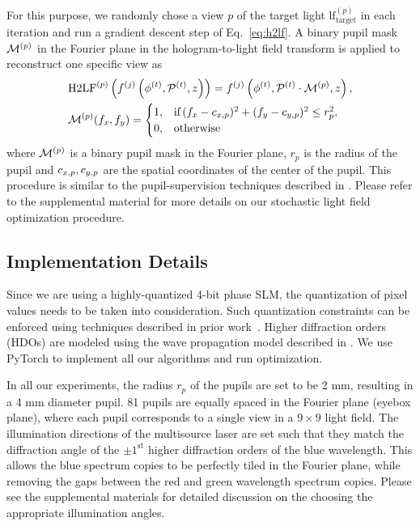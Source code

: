For this purpose, we randomly chose a view $p$ of the target light $\text{lf}^{(p)}_\text{target}$ in each iteration and run a gradient descent step of Eq.~\ref{eq:h2lf}. A binary pupil mask $\mathcal{M}^{(p)}$ in the Fourier plane in the hologram-to-light field transform is applied to reconstruct one specific view as 
%
\begin{equation}
\begin{split}
    & \text{H2LF}^{(p)}\left( f^{(j)} \left(\phi^{(t)}, \mathcal{P}^{(t)}, z\right) \right) = f^{(j)} \left(\phi^{(t)}, \mathcal{P}^{(t)} \cdot \mathcal{M}^{(p)}, z\right), \\
    & \mathcal{M}^{(p)}(f_x, f_y) = \begin{cases}
        1, & \text{if} \, (f_x - c_{x, p})^2 + (f_y - c_{y, p})^2 \leq r_p^2, \\
        0, & \text{otherwise}
    \end{cases}
\end{split}
\label{eq:pupil}
\end{equation}
%
where $\mathcal{M}^{(p)}$ is a binary pupil mask in the Fourier plane, $r_p$ is the radius of the pupil and $c_{x, p}, c_{y, p}$ are the spatial coordinates of the center of the pupil. This procedure is similar to the pupil-supervision techniques described in \cite{shi2024ergo, schiffers2023stochastic, chakravarthula2022pupil}. Please refer to the supplemental material for more details on our stochastic light field optimization procedure.


\subsection{Implementation Details}

Since we are using a highly-quantized 4-bit phase SLM, the quantization of pixel values needs to be taken into consideration. Such quantization constraints can be enforced using techniques described in prior work~\cite{choi2022flex}. Higher diffraction orders (HDOs) are modeled using the wave propagation model described in \cite{gopakumar2021unfiltered}. We use PyTorch to implement all our algorithms and run optimization.

In all our experiments, the radius $r_p$ of the pupils are set to be 2 mm, resulting in a 4 mm diameter pupil. 81 pupils are equally spaced in the Fourier plane (eyebox plane), where each pupil corresponds to a single view in a $9 \times 9$ light field. The illumination directions of the multisource laser are set such that they match the diffraction angle of the $\pm 1^{\text{st}}$ higher diffraction orders of the blue wavelength. This allows the blue spectrum copies to be perfectly tiled in the Fourier plane, while removing the gaps between the red and green wavelength spectrum copies. Please see the supplemental materials for detailed discussion on the choosing the appropriate illumination angles.


